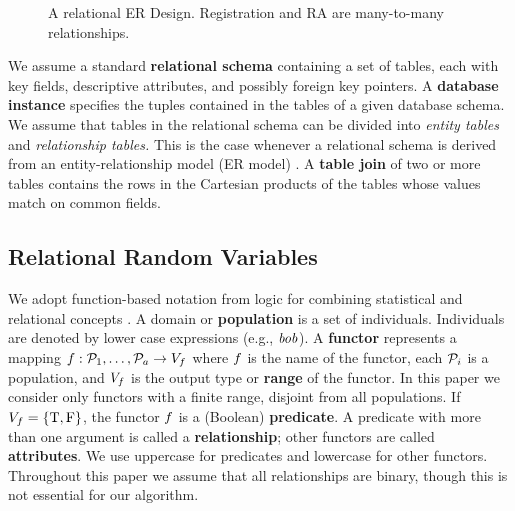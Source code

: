 \documentclass{acm_proc_article-sp}
\begin{document}
\begin{figure}[htbp] 
 \centering
{} 
\caption{A relational ER Design. Registration and RA are many-to-many relationships.}
 \label{fig:university-schema}
\end{figure}
 We assume a standard \textbf{relational schema} containing a set of tables, each with key fields, 
descriptive attributes, and possibly foreign key pointers. 
A \textbf{database instance} specifies the tuples contained in the tables of a given database schema. 
We assume that tables in the relational schema can be divided into {\em entity tables} and {\em relationship tables.} 
This is the case whenever a relational schema is derived from an entity-relationship model (ER model) \cite[Ch.2.2]{Ullman1982}. A \textbf{table join} of two or more tables contains the rows in the Cartesian products of the tables whose values match on common fields.


\subsection{Relational Random Variables} \label{sec:variables}
We adopt function-based notation from logic for combining statistical and relational concepts \cite{Russell2010}.
A domain or \textbf{population} is a set of individuals.
Individuals are denoted by lower case expressions (e.g., $\it{bob}$). 
A \textbf{functor} represents a mapping
$f: \mathcal{P}_{1},\ldots,\mathcal{P}_{a} \rightarrow V_{f}$
where $f$ is the name of the functor, each $\mathcal{P}_{i}$ is a population, and $V_{f}$ is the output type or \textbf{range} of the functor. 
In this paper we consider only functors with a finite range, disjoint from all populations.  If $V_{f} = \{\mathrm{T},\mathrm{F}\}$, the functor $f$ is a (Boolean) \textbf{predicate}. A predicate with more than one argument is called a \textbf{relationship}; other functors are called \textbf{attributes}. We use uppercase for predicates and lowercase for other functors. Throughout this paper we assume that all relationships are binary, though this is not essential for our algorithm.
\end{document}
